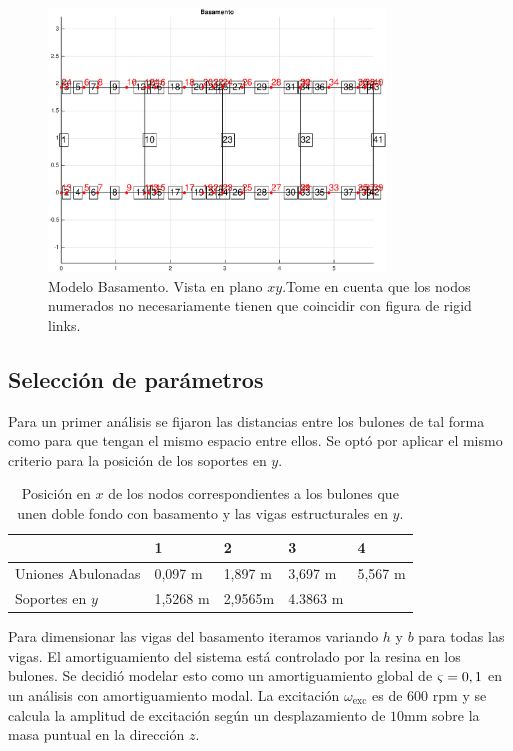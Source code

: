 \documentclass[onecolumn,10pt,titlepage,a4paper]{article}
\begin{document}
\begin{figure}[htb!]
	\centering
	\includegraphics[width=0.8\textwidth]{fig/modelbasamento.eps}
	\caption{Modelo Basamento. Vista en plano $x\!y$.Tome en cuenta que los nodos numerados no necesariamente tienen que coincidir con figura de rigid links.}
	\label{fig:modelobasamento}
\end{figure}

\subsection*{Selección de parámetros}
Para un primer análisis se fijaron las distancias entre los bulones de tal forma como para que tengan el mismo espacio entre ellos. Se optó por aplicar el mismo criterio para la posición de los soportes en $y$.


\begin{table}[htb!]
	\centering
	\begin{tabular}{lllll}
		& 1 & 2 & 3 & 4 \\ \hline
		Uniones Abulonadas& 0,097 \si{\meter}  & 1,897 \si{ \meter} & 3,697 \si{ \meter} & 5,567 \si{ \meter} \\
		Soportes en $y$& 1,5268 \si{\meter}  &2,9565\si{\meter}   & 4.3863 \si{\meter}  &  \\
	\end{tabular}
\caption{Posición en $x$ de los nodos correspondientes a los bulones que unen doble fondo con basamento y las vigas estructurales en $y$.}
\end{table}

Para dimensionar las vigas del basamento iteramos variando $h$ y $b$ para todas las vigas. El amortiguamiento del sistema está controlado por la resina en los bulones. Se decidió modelar esto como un amortiguamiento global de $\varsigma = 0,1$ en un análisis con amortiguamiento modal. La excitación $\omega_{\mathrm{exc}}$ es de 600 rpm y se calcula la amplitud de excitación según un desplazamiento de $10$mm sobre la masa puntual en la dirección $z$.
\end{document}
